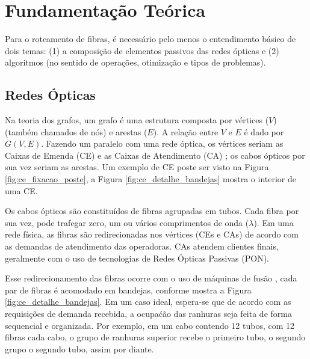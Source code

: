 \section{Fundamentação Teórica} \label{sec:fundaments}

Para o roteamento de fibras, é necessário pelo menos o entendimento básico de
dois temas: (1) a composição de elementos passivos das redes ópticas e (2)
algoritmos (no sentido de operações, otimização e tipos de problemas).

\subsection{Redes Ópticas}

Na teoria dos grafos, um grafo é uma estrutura composta por vértices ($V$)
(também chamados de nós) e arestas ($E$). A relação entre $V$ e $E$ é dado por
$G(V,E)$. Fazendo um paralelo com uma rede óptica, os vértices seriam as Caixas
de Emenda (CE) e as Caixas de Atendimento (CA) \cite{maeda2009optical}; os
cabos ópticos por sua vez seriam as arestas. Um exemplo de CE poste ser visto
na Figura \ref{fig:ce_fixacao_poste}, a Figura \ref{fig:ce_detalhe_bandejas}
mostra o interior de uma CE.

Os cabos ópticos são constituídos de fibras agrupadas em tubos. Cada fibra por
sua vez, pode trafegar zero, um ou vários comprimentos de onda ($\lambda$).
Em uma rede física, as fibras são redirecionadas nos vértices (CEs e CAs) de
acordo com as demandas de atendimento das operadoras. CAs atendem clientes finais,
geralmente com o uso de tecnologias de Redes Ópticas Passivas (PON).

Esse redirecionamento das fibras ocorre com o uso de máquinas de fusão
\cite{maeda2009optical}, cada par de fibras é acomodado em bandejas, conforme
mostra a Figura \ref{fig:ce_detalhe_bandejas}. Em um caso ideal, espera-se que
de acordo com as requisições de demanda recebida, a ocupaćão das ranhuras seja
feita de forma sequencial e organizada. Por exemplo, em um cabo contendo 12
tubos, com 12 fibras cada cabo, o grupo de ranhuras superior recebe o primeiro
tubo, o segundo grupo o segundo tubo, assim por diante.

